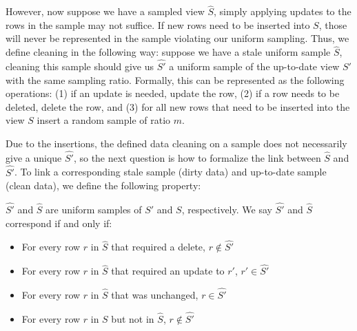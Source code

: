 However, now suppose we have a sampled view $\widehat{S}$, simply applying updates to the rows in the sample may not suffice.
If new rows need to be inserted into $S$, those will never be represented in the sample violating our uniform sampling.
Thus, we define cleaning in the following way: suppose we have a stale uniform sample $\widehat{S}$, cleaning this sample
should give us $\widehat{S'}$ a uniform sample of the up-to-date view $S'$ with the same sampling ratio.
Formally, this can be represented as the following operations: (1) if an update is needed, update the row, (2) if a row needs to be deleted, delete the row, and (3) for all new rows that need to be inserted into the view $S$ insert a random sample of ratio $m$.

Due to the insertions, the defined data cleaning on a sample does not necessarily give a unique $\widehat{S'}$, so the next question is how to formalize the link between $\widehat{S}$ and $\widehat{S'}$. 
To link a corresponding stale sample (dirty data) and up-to-date sample (clean data), we define the following property:
\begin{definition}[Correspondence]
$\widehat{S'}$ and $\widehat{S}$ are uniform samples of $S'$ and $S$, respectively.  We say $\widehat{S'}$ and $\widehat{S}$ correspond if and only if:
\vspace{-.25em}
\begin{itemize}[noitemsep]
\item For every row $r$ in $\widehat{S}$ that required a delete, $r \not\in \widehat{S'}$
\item For every row $r$ in $\widehat{S}$ that required an update to $r'$, $r' \in \widehat{S'}$
\item For every row $r$ in $\widehat{S}$  that was unchanged, $r \in \widehat{S'}$
\item For every row $r$ in $S$ but not in $\widehat{S}$, $r \not\in \widehat{S'}$
\end{itemize}
\vspace{-.25em}
\label{correspondence}
\end{definition}

